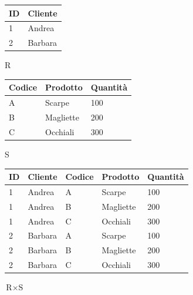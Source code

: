 \begin{center}

    \begin{minipage}{0.35\textwidth}
        \centering
        
        \begin{tabular}{|l|l|}
        \hline
        \textbf{ID} & \textbf{Cliente} \\ \hline
        1 & Andrea \\ \hline
        2 & Barbara \\ \hline
        \end{tabular}
        
        \vspace{2mm}
        R
        
        \vspace{1cm} %
        
        \begin{tabular}{|l|l|l|}
        \hline
        \textbf{Codice} & \textbf{Prodotto} & \textbf{Quantità} \\ \hline
        A & Scarpe & 100 \\ \hline
        B & Magliette & 200 \\ \hline
        C & Occhiali & 300 \\ \hline
        \end{tabular}
        
        \vspace{2mm}
        S
        
    \end{minipage}%
    \hfill
    \begin{minipage}{0.6\textwidth}
        \centering
        
        \begin{tabular}{|l|l|l|l|l|}
        \hline
        \textbf{ID} & \textbf{Cliente} & \textbf{Codice} & \textbf{Prodotto} & \textbf{Quantità} \\ \hline
        1 & Andrea & A & Scarpe & 100 \\ \hline
        1 & Andrea & B & Magliette & 200 \\ \hline
        1 & Andrea & C & Occhiali & 300 \\ \hline
        2 & Barbara & A & Scarpe & 100 \\ \hline
        2 & Barbara & B & Magliette & 200 \\ \hline
        2 & Barbara & C & Occhiali & 300 \\ \hline
        \end{tabular}
        
        \vspace{2mm}
        $\text{R} \times \text{S}$
        
    \end{minipage}

\end{center}

